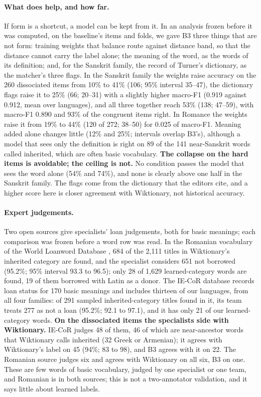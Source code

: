 \documentclass[11pt]{article}
\begin{document}
\paragraph{What does help, and how far.} If form is a shortcut, a model can be kept from it. In an analysis frozen before it was computed, on the baseline's items and folds, we gave B3 three things that are not form: training weights that balance route against distance band, so that the distance cannot carry the label alone; the meaning of the word, as the words of its definition; and, for the Sanskrit family, the record of Turner's dictionary, as the matcher's three flags. In the Sanskrit family the weights raise accuracy on the 260 dissociated items from 10\% to 41\% (106; 95\% interval 35--47), the dictionary flags raise it to 25\% (66; 20--31) with a slightly higher macro-F1 (0.919 against 0.912, mean over languages), and all three together reach 53\% (138; 47--59), with macro-F1 0.890 and 93\% of the congruent items right. In Romance the weights raise it from 19\% to 44\% (120 of 272; 38--50) for 0.025 of macro-F1. Meaning added alone changes little (12\% and 25\%; intervals overlap B3's), although a model that sees only the definition is right on 89 of the 141 near-Sanskrit words called inherited, which are often basic vocabulary. \textbf{The collapse on the hard items is avoidable; the ceiling is not.} No condition passes the model that sees the word alone (54\% and 74\%), and none is clearly above one half in the Sanskrit family. The flags come from the dictionary that the editors cite, and a higher score here is closer agreement with Wiktionary, not historical accuracy.

\paragraph{Expert judgements.} Two open sources give specialists' loan judgements, both for basic meanings; each comparison was frozen before a word row was read. In the Romanian vocabulary of the World Loanword Database \citep{schulte2009romanian}, 684 of the 2,111 titles in Wiktionary's inherited category are found, and the specialist considers 651 not borrowed (95.2\%; 95\% interval 93.3 to 96.5); only 28 of 1,629 learned-category words are found, 19 of them borrowed with Latin as a donor. The IE-CoR database \citep{heggarty2024iecor} records loan status for 170 basic meanings and includes thirteen of our languages, from all four families: of 291 sampled inherited-category titles found in it, its team treats 277 as not a loan (95.2\%; 92.1 to 97.1), and it has only 21 of our learned-category words. \textbf{On the dissociated items the specialists side with Wiktionary.} IE-CoR judges 48 of them, 46 of which are near-ancestor words that Wiktionary calls inherited (32 Greek or Armenian); it agrees with Wiktionary's label on 45 (94\%; 83 to 98), and B3 agrees with it on 22. The Romanian source judges six and agrees with Wiktionary on all six, B3 on one. These are few words of basic vocabulary, judged by one specialist or one team, and Romanian is in both sources; this is not a two-annotator validation, and it says little about learned labels.
\end{document}
